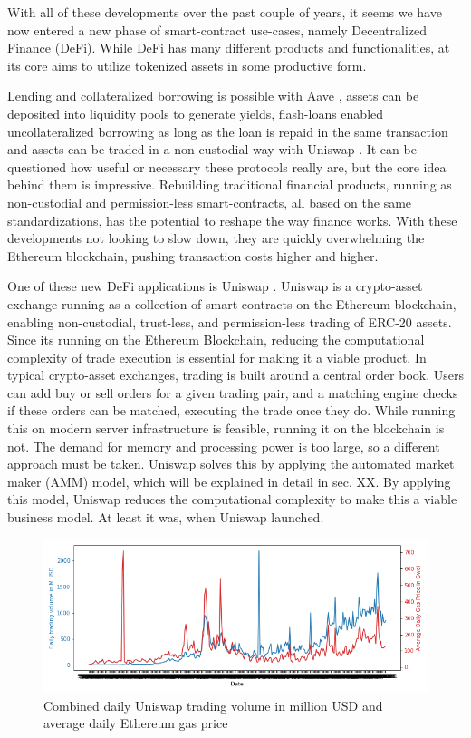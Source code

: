 \documentclass[../../thesis.tex]{subfiles}
\begin{document}
With all of these developments over the past couple of years, it seems we have now entered a new phase of smart-contract use-cases, namely Decentralized Finance (DeFi). While DeFi has many different products and functionalities, at its core aims to utilize tokenized assets in some productive form. 


Lending and collateralized borrowing is possible with Aave \cite{kulechov_2020}, assets can be deposited into liquidity pools\cite{adams2020uniswap} to generate yields, flash-loans \cite{kulechov_2020}\cite{adams2020uniswap} enabled uncollateralized borrowing as long as the loan is repaid in the same transaction and assets can be traded in a non-custodial way with Uniswap \cite{adams2020uniswap} . It can be questioned how useful or necessary these protocols really are, but the core idea behind them is impressive. Rebuilding traditional financial products, running as non-custodial and permission-less smart-contracts, all based on the same standardizations, has the potential to reshape the way finance works. With these developments not looking to slow down, they are quickly overwhelming the Ethereum blockchain, pushing transaction costs \cite{gasprice} higher and higher. 

One of these new DeFi applications is Uniswap \cite{adams2020uniswap}. Uniswap is a crypto-asset exchange running as a collection of smart-contracts on the Ethereum blockchain, enabling non-custodial, trust-less, and permission-less trading of ERC-20 assets. Since its running on the Ethereum Blockchain, reducing the computational complexity of trade execution is essential for making it a viable product. In typical crypto-asset exchanges, trading is built around a central order book. Users can add buy or sell orders for a given trading pair, and a matching engine checks if these orders can be matched, executing the trade once they do. While running this on modern server infrastructure is feasible, running it on the blockchain is not. The demand for memory and processing power is too large, so a different approach must be taken. Uniswap solves this by applying the automated market maker (AMM) model, which will be explained in detail in sec. XX. By applying this model, Uniswap reduces the computational complexity to make this a viable business model. At least it was, when Uniswap launched. 

\begin{figure}[h]
    \centerline{\includegraphics[totalheight=5.6cm]{diagrams/gas_volume.png}}
    \caption{Combined daily Uniswap trading volume in million USD and average daily Ethereum gas price}
    \label{fig:gas_vol}
\end{figure}
\end{document}
